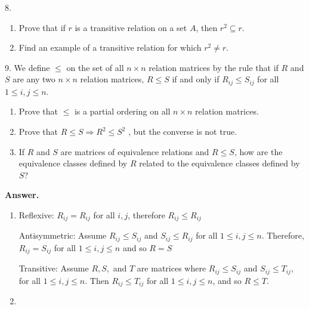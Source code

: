 \documentclass[10pt,]{book}
\theoremstyle{plain}
\theoremstyle{definition}
\theoremstyle{definition}
\theoremstyle{definition}
\theoremstyle{definition}
\begin{document}
\begin{exercisegroup}
\item[8.]\hypertarget{exercise-32}{}\leavevmode%
\begin{enumerate}[label=\alph*]
\item\hypertarget{li-110}{}Prove that if \(r\) is a transitive relation on a set \(A\), then \(r^2 \subseteq  r\). %
\item\hypertarget{li-111}{} Find an example of a transitive relation for which \(r^2\neq r\).%
\end{enumerate}
%
\par\smallskip
\item[9.]\hypertarget{exercise-33}{} We define \(\leq\) on the set of all \(n\times n\) relation matrices by the rule that if \(R\) and \(S\) are any two \(n\times n\)
relation matrices, \(R \leq  S\) if and only if \(R_{ij} \leq S_{ij}\) for all \(1 \leq  i, j \leq  n\).%
\par
\leavevmode%
\begin{enumerate}[label=\alph*]
\item\hypertarget{li-112}{} Prove that \(\leq\) is a partial ordering on all \(n\times n\) relation matrices.%
\item\hypertarget{li-113}{} Prove that \(R \leq  S  \Rightarrow   R^2\leq S^2\) , but the converse is not true.%
\item\hypertarget{li-114}{} If \(R\) and \(S\) are matrices of equivalence relations and \(R \leq  S\), how are the equivalence classes defined by \(R\) related to the equivalence classes defined by \(S\)?%
\end{enumerate}
%
\par\smallskip
\par\smallskip
\noindent\textbf{Answer.}\hypertarget{answer-17}{}\quad
\leavevmode%
\begin{enumerate}[label=\alph*]
\item\hypertarget{li-115}{}Reflexive: \(R_{ij}=R_{ij}\) for all \(i,j\), therefore \(R_{ij}\leq R_{ij}\)%
\par
 Antisymmetric: Assume \(R_{ij}\leq S_{ij}\) and \(S_{ij}\leq R_{ij}\) for all \(1\leq i,j\leq n\). Therefore, \(R_{ij} = S_{ij}\) for all \(1\leq i,j\leq n\)  and so \(R=S\)%
\par
Transitive: Assume \(R, S,\) and \(T\) are matrices where \(R_{ij}\leq S_{ij}\) and \(S_{ij}\leq T_{ij}\), for all \(1\leq i,j\leq n\). Then \(R_{ij}\leq T_{ij}\) for all \(1\leq i,j\leq n\), and so \(R\leq T\).%
\item\hypertarget{li-116}{}\begin{equation*}

\end{equation*}
\end{enumerate}
\end{exercisegroup}
\end{document}
